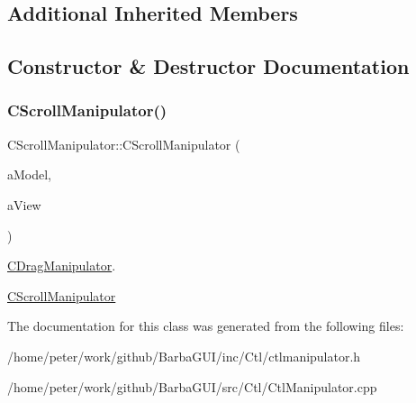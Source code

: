 \subsection*{Additional Inherited Members}


\subsection{Constructor \& Destructor Documentation}
\mbox{\label{classCScrollManipulator_a4ec182540b21abb51ccbfc8fbb04b1fe}} 
\subsubsection{\texorpdfstring{C\+Scroll\+Manipulator()}{CScrollManipulator()}}
{\footnotesize\ttfamily C\+Scroll\+Manipulator\+::\+C\+Scroll\+Manipulator (\begin{DoxyParamCaption}\item[{C\+M\+W\+Row $\ast$}]{a\+Model,  }\item[{C\+Scroll\+Bar\+Ctl $\ast$}]{a\+View }\end{DoxyParamCaption})}



\hyperlink{classCDragManipulator}{C\+Drag\+Manipulator}. 

\hyperlink{classCScrollManipulator}{C\+Scroll\+Manipulator} 

The documentation for this class was generated from the following files\+:\begin{DoxyCompactItemize}
\item 
/home/peter/work/github/\+Barba\+G\+U\+I/inc/\+Ctl/ctlmanipulator.\+h\item 
/home/peter/work/github/\+Barba\+G\+U\+I/src/\+Ctl/Ctl\+Manipulator.\+cpp\end{DoxyCompactItemize}
